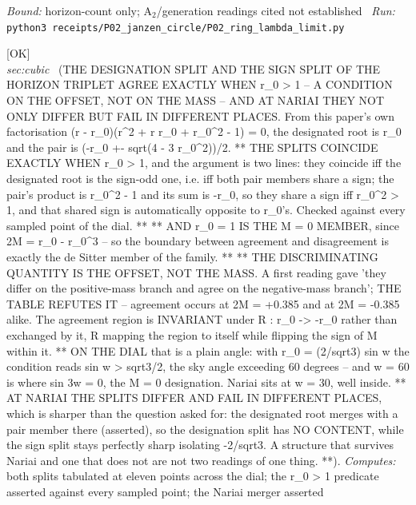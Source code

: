 \begin{description}
 \emph{Bound:} horizon-count only; A\ensuremath{_2}/generation readings cited not established
\ \emph{Run:} \texttt{python3 receipts/P02\_janzen\_circle/P02\_ring\_lambda\_limit.py}
\item[\label{rcpt:P03_the_two_splits}\texttt{P03\_the\_two\_splits}]\hfill\textsf{[OK]}\\
\textit{sec:cubic} \ (THE DESIGNATION SPLIT AND THE SIGN SPLIT OF THE HORIZON TRIPLET AGREE EXACTLY WHEN \textbar{}r\_0\textbar{} > 1 -- A CONDITION ON THE OFFSET, NOT ON THE MASS -- AND AT NARIAI THEY NOT ONLY DIFFER BUT FAIL IN DIFFERENT PLACES. From this paper's own factorisation (r - r\_0)(r\textasciicircum{}2 + r r\_0 + r\_0\textasciicircum{}2 - 1) = 0, the designated root is r\_0 and the pair is (-r\_0 +- sqrt(4 - 3 r\_0\textasciicircum{}2))/2. ** THE SPLITS COINCIDE EXACTLY WHEN \textbar{}r\_0\textbar{} > 1, and the argument is two lines: they coincide iff the designated root is the sign-odd one, i.e. iff both pair members share a sign; the pair's product is r\_0\textasciicircum{}2 - 1 and its sum is -r\_0, so they share a sign iff r\_0\textasciicircum{}2 > 1, and that shared sign is automatically opposite to r\_0's. Checked against every sampled point of the dial. ** ** AND \textbar{}r\_0\textbar{} = 1 IS THE M = 0 MEMBER, since 2M = r\_0 - r\_0\textasciicircum{}3 -- so the boundary between agreement and disagreement is exactly the de Sitter member of the family. ** ** THE DISCRIMINATING QUANTITY IS THE OFFSET, NOT THE MASS. A first reading gave 'they differ on the positive-mass branch and agree on the negative-mass branch'; THE TABLE REFUTES IT -- agreement occurs at 2M = +0.385 and at 2M = -0.385 alike. The agreement region is INVARIANT under R : r\_0 -> -r\_0 rather than exchanged by it, R mapping the region to itself while flipping the sign of M within it. ** ON THE DIAL that is a plain angle: with r\_0 = (2/sqrt3) sin w the condition reads \textbar{}sin w\textbar{} > sqrt3/2, the sky angle exceeding 60 degrees -- and w = 60 is where sin 3w = 0, the M = 0 designation. Nariai sits at w = 30, well inside. ** AT NARIAI THE SPLITS DIFFER AND FAIL IN DIFFERENT PLACES, which is sharper than the question asked for: the designated root merges with a pair member there (asserted), so the designation split has NO CONTENT, while the sign split stays perfectly sharp isolating -2/sqrt3. A structure that survives Nariai and one that does not are not two readings of one thing. **). 
\emph{Computes:} both splits tabulated at eleven points across the dial; the \textbar{}r\_0\textbar{} > 1 predicate asserted against every sampled point; the Nariai merger asserted

\end{description}
